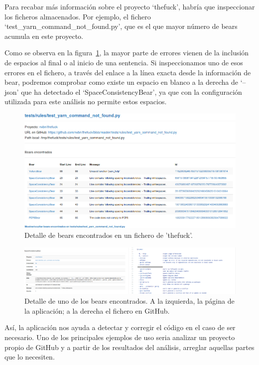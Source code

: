 \documentclass[a4paper, 12pt]{book}
\begin{document}
Para recabar más información sobre el proyecto `thefuck', habría que inspeccionar los ficheros almacenados. Por ejemplo, el fichero `test\_yarn\_command\_not\_found.py', que es el que mayor número de bears acumula en este proyecto.

Como se observa en la figura~\ref{fig:ficheroTheFuck}, la mayor parte de errores vienen de la inclusión de espacios al final o al inicio de una sentencia. Si inspeccionamos uno de esos errores en el fichero, a través del enlace a la línea exacta desde la información de bear, podremos comprobar como existe un espacio en blanco a la derecha de `--json' que ha detectado el `SpaceConsistencyBear', ya que con la configuración utilizada para este análisis no permite estos espacios.

\begin{figure}[H]
  \centering
  \includegraphics[width=15cm, keepaspectratio]{img/ficheroTheFuck}
  \caption{Detalle de bears encontrados en un fichero de 'thefuck'.}
  \label{fig:ficheroTheFuck}
\end{figure}

\begin{figure}[H]
  \centering
  \includegraphics[width=17cm, keepaspectratio]{img/bearData}
  \caption{Detalle de uno de los bears encontrados. A la izquierda, la página de la aplicación; a la derecha el fichero en GitHub.}
  \label{fig:bearData}
\end{figure}

Así, la aplicación nos ayuda a detectar y corregir el código en el caso de ser necesario. Uno de los principales ejemplos de uso seria analizar un proyecto propio de GitHub y a partir de los resultados del análisis, arreglar aquellas partes que lo necesiten.
\end{document}
